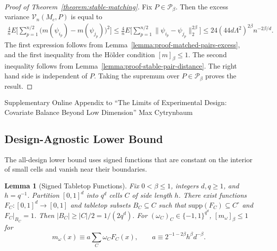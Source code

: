 \documentclass[letterpaper,12pt]{article}
\newtheorem{lem}[thm]{Lemma}
\theoremstyle{definition}
\numberwithin{equation}{section}
\newcommand{\mc}{\mathcal}
\begin{document}
\begin{proof}[Proof of Theorem~\ref{theorem:stable-matching}]
Fix $P\in\mathcal P_\beta$.
Then the excess variance $\mc V_n(M_c,P)$ is equal to
\begin{align*}
\frac4nE\bigg[\sum_{p=1}^{n/2}\big(m(\psi_{i_p})-m(\psi_{j_p})\big)^2\bigg] \leq\frac4nE\bigg[\sum_{p=1}^{n/2}\|\psi_{i_p}-\psi_{j_p}\|_2^{2\beta}\bigg]\leq24(44d\Lambda^2)^{2\beta}n^{-2\beta/d}.
\end{align*}
The first expression follows from Lemma~\ref{lemma:proof-matched-pairs-excess}, and the first inequality from the H\"older condition $[m]_\beta\leq1$.
The second inequality follows from Lemma~\ref{lemma:proof-stable-pair-distance}.
The right hand side is independent of $P$.
Taking the supremum over $P\in\mathcal P_\beta$ proves the result.
\end{proof}

\clearpage
\hypersetup{pageanchor=false}

\begin{center}
{\Large Supplementary Online Appendix to ``The Limits of Experimental Design: Covariate Balance Beyond Low Dimension''}
\vskip 24pt
{\large Max Cytrynbaum}
\end{center}

\subsection{Design-Agnostic Lower Bound}\label{appendix:proofs-design-agnostic}

The all-design lower bound uses signed functions that are constant on the interior of small cells and vanish near their boundaries.

\begin{lem}[Signed Tabletop Functions]\label{lemma:proof-signed-tabletops}
Fix $0<\beta\leq1$, integers $d,q\geq1$, and $h=q^{-1}$.
Partition $[0,1]^d$ into $q^d$ cells $C$ of side length $h$.
There exist functions $F_C:[0,1]^d\to[0,1]$ and tabletop subsets $B_C\subseteq C$ such that $\mathrm{supp}(F_C)\subseteq C^\circ$ and $F_C|_{B_C}=1$.
Then $|B_C|\geq|C|/2=1/(2q^d)$.
For $(\omega_C)_C\in\{-1,1\}^{q^d}$, $[m_\omega]_\beta\leq1$ for
\begin{equation}\label{equation:proof-tabletop-witness}
m_\omega(x) \equiv a\sum_C\omega_C F_C(x), \qquad a \equiv 2^{-1-2\beta}h^\beta d^{-\beta}.
\end{equation}
\end{lem}
\end{document}
